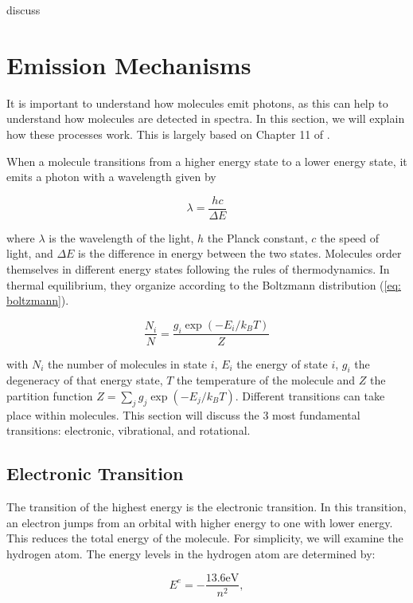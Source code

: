 \documentclass[twoside, single, authoryear, semicolon, 12pt]{lion-msc}
\newcommand{\4}{$_4$}
\newcommand{\3}{$_3$}
\newcommand{\2}{$_2$}
\begin{document}
discuss \cite{van_Gelder_2024}
\section{Emission Mechanisms}
It is important to understand how molecules emit photons, as this can help to understand how molecules are detected in spectra. In this section, we will explain how these processes work. This is largely based on Chapter 11 of \cite{1979rpa..book.....R}. 

When a molecule transitions from a higher energy state to a lower energy state, it emits a photon with a wavelength given by

\begin{equation}
    \lambda=\frac{hc}{\Delta E}
\end{equation}

where $\lambda$ is the wavelength of the light, $h$ the Planck constant, $c$ the speed of light, and $\Delta E$ is the difference in energy between the two states. Molecules order themselves in different energy states following the rules of thermodynamics. In thermal equilibrium, they organize according to the Boltzmann distribution (\autoref{eq: boltzmann}). 

\begin{equation}
    \frac{N_i}{N}=\frac{g_i\exp{(-E_i/k_BT)}}{Z}
    \label{eq: boltzmann}
\end{equation}

with $N_i$ the number of molecules in state $i$, $E_i$ the energy of state $i$, $g_i$ the degeneracy of that energy state, $T$ the temperature of the molecule and $Z$ the partition function $Z=\sum_j g_j\exp{(-E_j/k_BT)}$.
Different transitions can take place within molecules. This section will discuss the 3 most fundamental transitions: electronic, vibrational, and rotational.

\subsection{Electronic Transition}
The transition of the highest energy is the electronic transition. In this transition, an electron jumps from an orbital with higher energy to one with lower energy. This reduces the total energy of the molecule. For simplicity, we will examine the hydrogen atom. The energy levels in the hydrogen atom are determined by: 

\begin{equation}
    E^e=-\frac{13.6\mathrm{ eV}}{n^2},
    \label{eq: electronic}
\end{equation}
\end{document}
